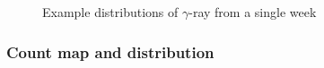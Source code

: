 \documentclass{beamer}
\begin{document}
\begin{frame}
\begin{figure}
\begin{minipage}[b]{0.49\textwidth}
    \end{minipage}
    \caption{Example distributions of $\gamma$-ray from a single week}
    \label{fig:exphotondist}
\end{figure}
\end{frame}

\begin{frame}\frametitle{Count map and distribution}
  \begin{figure}
      \centering
  \end{figure}
\end{frame}
\end{document}
